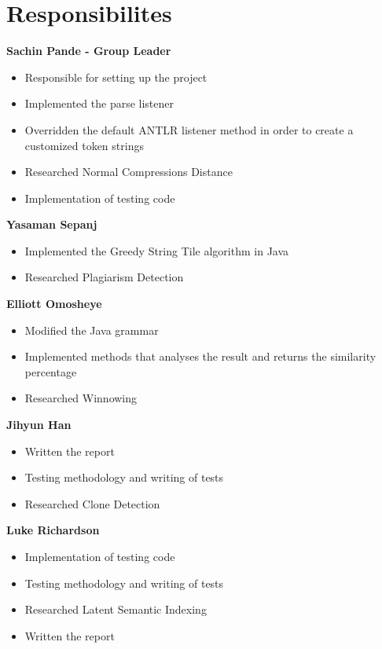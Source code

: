 \section{Responsibilites}
\textbf{Sachin Pande - Group Leader}
\begin{itemize}
\item Responsible for setting up the project
\item Implemented the parse listener
\item Overridden the default ANTLR listener method in order to create a customized token strings
\item Researched Normal Compressions Distance
\item Implementation of testing code\\
\end{itemize}
\textbf{Yasaman Sepanj}
\begin{itemize}
\item Implemented the Greedy String Tile algorithm in Java
\item Researched Plagiarism Detection\\
\end{itemize}
\textbf{Elliott Omosheye}
\begin{itemize}
\item Modified the Java grammar
\item Implemented methods that analyses the result and returns the similarity percentage
\item Researched Winnowing\\
\end{itemize}
\textbf{Jihyun Han}
\begin{itemize}
\item Written the report
\item Testing methodology and writing of tests
\item Researched Clone Detection\\
\end{itemize}
\textbf{Luke Richardson}
\begin{itemize}
\item Implementation of testing code
\item Testing methodology and writing of tests
\item Researched Latent Semantic Indexing
\item Written the report
\end{itemize}
\break
